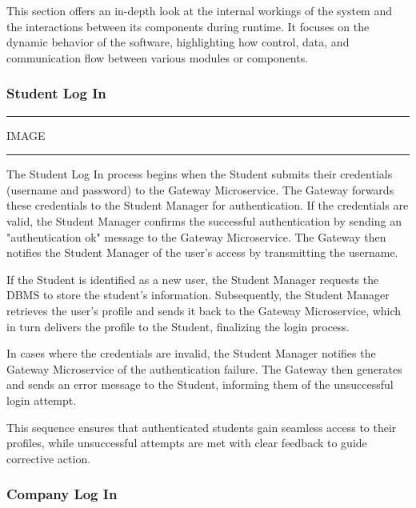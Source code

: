 This section offers an in-depth look at the internal workings of the system and the interactions between its components during runtime. It focuses on the dynamic behavior of the software, highlighting how control, data, and communication flow between various modules or components.

\subsubsection{Student Log In}

\vspace{20pt}
\hrule
\vspace{10pt}
IMAGE
\vspace{10pt}
\hrule
\vspace{20pt}

The Student Log In process begins when the Student submits their credentials (username and password) to the Gateway Microservice. The Gateway forwards these credentials to the Student Manager for authentication. If the credentials are valid, the Student Manager confirms the successful authentication by sending an "authentication ok" message to the Gateway Microservice. The Gateway then notifies the Student Manager of the user's access by transmitting the username.

If the Student is identified as a new user, the Student Manager requests the DBMS to store the student's information. Subsequently, the Student Manager retrieves the user's profile and sends it back to the Gateway Microservice, which in turn delivers the profile to the Student, finalizing the login process.

In cases where the credentials are invalid, the Student Manager notifies the Gateway Microservice of the authentication failure. The Gateway then generates and sends an error message to the Student, informing them of the unsuccessful login attempt.

This sequence ensures that authenticated students gain seamless access to their profiles, while unsuccessful attempts are met with clear feedback to guide corrective action.

\subsubsection{Company Log In}

